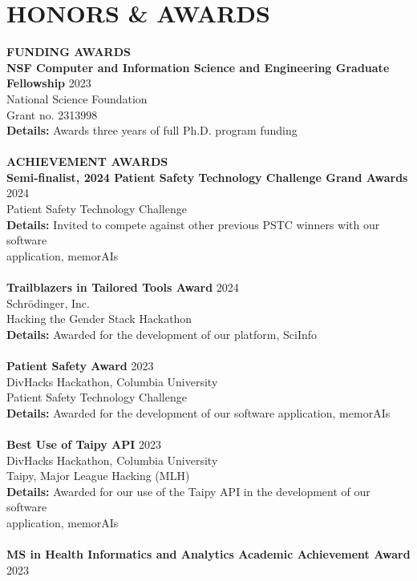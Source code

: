 \documentclass[a4paper,12pt]{article}
\begin{document}
{\section*{HONORS \& AWARDS}
\textbf{FUNDING AWARDS} \\[0.5em]
\textbf{NSF Computer and Information Science and Engineering Graduate Fellowship} \hfill 2023\\
National Science Foundation\\
Grant no. 2313998 \\
\textbf{Details:} Awards three years of full Ph.D. program funding \\
\\
\textbf{ACHIEVEMENT AWARDS} \\[0.5em]
\textbf{Semi-finalist, 2024 Patient Safety Technology Challenge Grand Awards} \hfill 2024\\
Patient Safety Technology Challenge\\
\textbf{Details:} Invited to compete against other previous PSTC winners with our software \\application, memorAIs \\
\\
\textbf{Trailblazers in Tailored Tools Award} \hfill 2024\\
Schrödinger, Inc.\\
Hacking the Gender Stack Hackathon\\
\textbf{Details:} Awarded for the development of our platform, SciInfo \\
\\
\textbf{Patient Safety Award} \hfill 2023\\
DivHacks Hackathon, Columbia University\\
Patient Safety Technology Challenge\\
\textbf{Details:} Awarded for the development of our software application, memorAIs \\
\\
\textbf{Best Use of Taipy API} \hfill 2023\\
DivHacks Hackathon, Columbia University\\
Taipy, Major League Hacking (MLH)\\
\textbf{Details:} Awarded for our use of the Taipy API in the development of our software \\application, memorAIs \\
\pagebreak 
\\
\textbf{MS in Health Informatics and Analytics Academic Achievement Award} \hfill 2023\\
}
\end{document}
